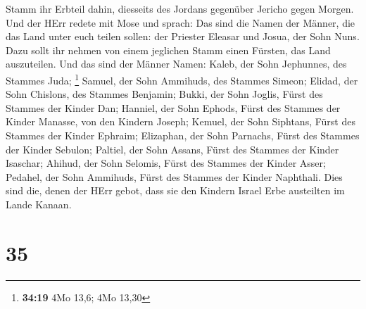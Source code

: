 Stamm ihr Erbteil dahin, diesseits des Jordans gegenüber Jericho gegen
Morgen.  Und der HErr redete mit Mose und sprach:
 Das sind die Namen der Männer, die das Land unter euch
teilen sollen: der Priester Eleasar und Josua, der Sohn Nuns.
 Dazu sollt ihr nehmen von einem jeglichen Stamm einen
Fürsten, das Land auszuteilen.  Und das sind der Männer
Namen: Kaleb, der Sohn Jephunnes, des Stammes Juda; \footnote{\textbf{34:19}
  4Mo 13,6; 4Mo 13,30}  Samuel, der Sohn Ammihuds, des
Stammes Simeon;  Elidad, der Sohn Chislons, des Stammes
Benjamin;  Bukki, der Sohn Joglis, Fürst des Stammes der
Kinder Dan;  Hanniel, der Sohn Ephods, Fürst des Stammes
der Kinder Manasse, von den Kindern Joseph;  Kemuel, der
Sohn Siphtans, Fürst des Stammes der Kinder Ephraim; 
Elizaphan, der Sohn Parnachs, Fürst des Stammes der Kinder Sebulon;
 Paltiel, der Sohn Assans, Fürst des Stammes der Kinder
Isaschar;  Ahihud, der Sohn Selomis, Fürst des Stammes
der Kinder Asser;  Pedahel, der Sohn Ammihuds, Fürst des
Stammes der Kinder Naphthali.  Dies sind die, denen der
HErr gebot, dass sie den Kindern Israel Erbe austeilten im Lande Kanaan.

\hypertarget{section-34}{%
\section{35}\label{section-34}}

